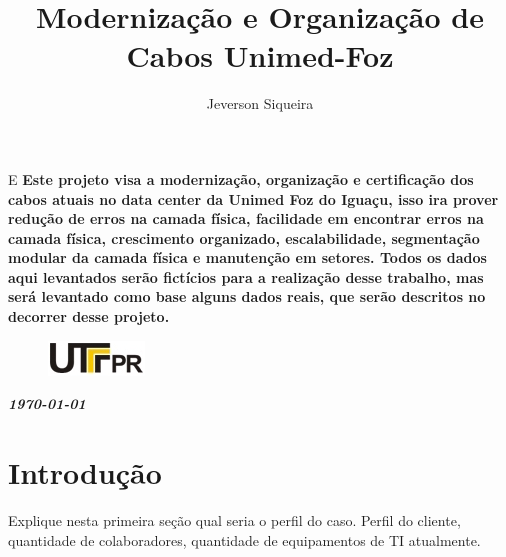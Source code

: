 \documentclass[	DIV=calc,%
							paper=a4,%
							fontsize=12pt,%
							onecolumn]{scrartcl}	 					%
\title{Modernização e Organização de Cabos Unimed-Foz}					%
\author{Jeverson Siqueira}  	%
\date{}																				%
\newcommand{\initial}[1]{%
     \lettrine[lines=3,lhang=0.3,nindent=0em]{
     				\color{DarkGoldenrod}
     				{\textsf{#1}}}{}}
\begin{document}
\maketitle
\thispagestyle{fancy} 	
\thispagestyle{empty}		%




\initial{E}\textbf{
	Este projeto visa a modernização, organização e certificação dos cabos atuais no data center da Unimed Foz do Iguaçu, isso ira prover redução de erros na camada física, facilidade em encontrar erros na camada física, crescimento organizado, escalabilidade, segmentação modular da camada física e manutenção em setores. Todos os dados aqui levantados serão fictícios para a realização desse trabalho, mas será levantado como base alguns dados reais, que serão descritos no decorrer desse projeto. 
}

\begin{figure}
	\centering
	\includegraphics{utfpr}
\end{figure}

\vspace{3cm}
\centerline{\textit{\textbf{\today}}}

\clearpage
    \renewcommand*\listfigurename{Lista de figuras}
\listoffigures

\renewcommand*\listtablename{Lista de tabelas}
\listoftables




\clearpage
\renewcommand{\contentsname}{Sumário}
\tableofcontents
\clearpage

\section{Introdução}

Explique nesta primeira seção qual seria o perfil do caso. Perfil do cliente, quantidade de colaboradores, quantidade de equipamentos de TI atualmente.
\end{document}

